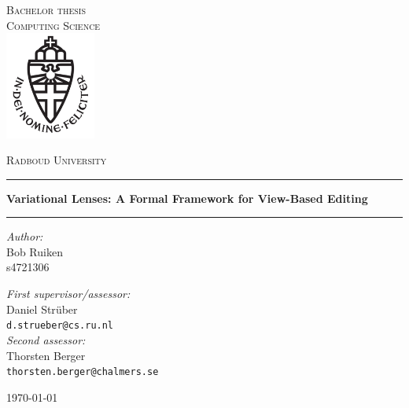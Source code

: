 \documentclass[11pt,a4paper]{report}
\theoremstyle{definition}
\begin{document}
\begin{titlepage}
\begin{center}
\textsc{\LARGE Bachelor thesis\\Computing Science}\\[1.5cm]
\includegraphics[height=100pt]{logo}

\vspace{0.4cm}
\textsc{\Large Radboud University}\\[1cm]
\hrule
\vspace{0.4cm}
\textbf{\Large Variational Lenses: A Formal Framework for View-Based Editing}\\[0.4cm]
\hrule
\vspace{2cm}
\begin{minipage}[t]{0.45\textwidth}
\begin{flushleft} \large
\textit{Author:}\\
Bob Ruiken\\
s4721306
\end{flushleft}
\end{minipage}
\begin{minipage}[t]{0.45\textwidth}
\begin{flushright} \large
\textit{First supervisor/assessor:}\\
Daniel Str{\"u}ber\\
\texttt{d.strueber@cs.ru.nl}\\[1.3cm]
\textit{Second assessor:}\\
Thorsten Berger\\
\texttt{thorsten.berger@chalmers.se}
\end{flushright}
\end{minipage}
\vfill
{\large \today}
\end{center}
\end{titlepage}



\setcounter{tocdepth}{1}
\tableofcontents

\setlength{\parskip}{10pt}













\end{document}

